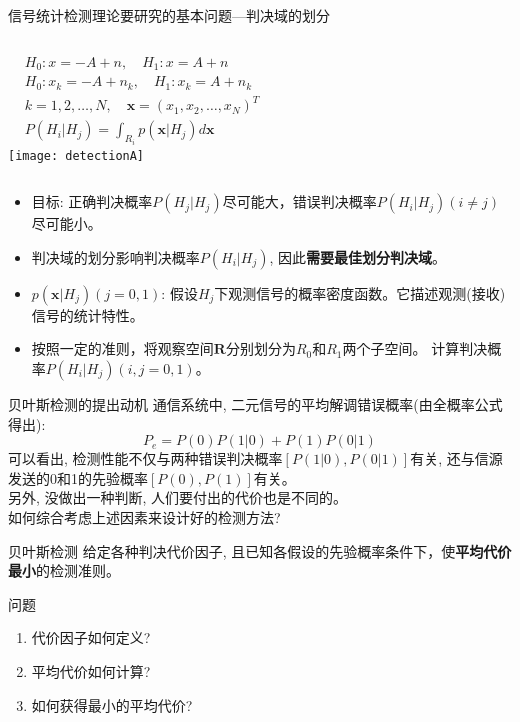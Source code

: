 \begin{frame}{信号统计检测理论要研究的基本问题---判决域的划分}
\begin{columns}
	\begin{align*}
	&H_0: x=-A+n,\quad H_1: x=A+n\\
	&H_0: x_k=-A+n_k,\quad H_1: x_k=A+n_k\\
	&k=1,2,\dots,N,\quad \bm{x}=(x_1,x_2,\dots,x_N)^{T}\\
	&P(H_i|H_j)=\int_{R_i}p(\bm{x}|H_j)d\bm{x}
	\end{align*}
	\texttt{[image: detectionA]}
\end{columns}
\begin{itemize}
	\item 目标: 正确判决概率$P(H_j|H_j)$尽可能大，错误判决概率$P(H_i|H_j)(i\ne j)$尽可能小。
	\item 判决域的划分影响判决概率$P(H_i|H_j)$, 因此\textbf{需要最佳划分判决域}。
	\item $p(\bm{x}|H_j)(j=0,1)$: 假设$H_j$下观测信号的概率密度函数。它描述观测(接收)信号的统计特性。
	\item 按照一定的准则，将观察空间$\bm{R}$分别划分为$R_0$和$R_1$两个子空间。
	计算判决概率$P(H_i|H_j)(i,j=0,1)$。	
\end{itemize}
\end{frame}

\begin{frame}{贝叶斯检测的提出动机}
通信系统中, 二元信号的平均解调错误概率(由全概率公式得出):
\[ P_e=P(0)P(1|0)+P(1)P(0|1)\]
可以看出, 检测性能不仅与两种错误判决概率$[P(1|0),P(0|1)]$有关, 还与信源发送的0和1的先验概率$[P(0),P(1)]$有关。\\
另外, 没做出一种判断, 人们要付出的代价也是不同的。\\
如何综合考虑上述因素来设计好的检测方法?
\begin{block}{贝叶斯检测}
	给定各种判决代价因子, 且已知各假设的先验概率条件下，使\textbf{平均代价最小}的检测准则。
\end{block}
\end{frame}

\begin{frame}{问题}
\begin{enumerate}
	\item 代价因子如何定义?
	\item 平均代价如何计算?
	\item 如何获得最小的平均代价?
\end{enumerate}
\end{frame}

